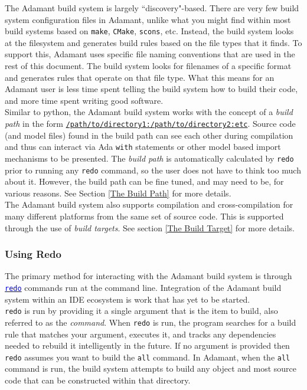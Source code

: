 The Adamant build system is largely ``discovery"-based. There are very few build system configuration files in Adamant, unlike what you might find within most build systems based on \texttt{make}, \texttt{CMake}, \texttt{scons}, etc. Instead, the build system looks at the filesystem and generates build rules based on the file types that it finds. To support this, Adamant uses specific file naming conventions that are used in the rest of this document. The build system looks for filenames of a specific format and generates rules that operate on that file type. What this means for an Adamant user is less time spent telling the build system how to build their code, and more time spent writing good software. \\

Similar to python, the Adamant build system works with the concept of a \textit{build path} in the form \texttt{\url{/path/to/directory1:/path/to/directory2:etc}}. Source code (and model files) found in the build path can see each other during compilation and thus can interact via Ada \texttt{with} statements or other model based import mechanisms to be presented. The \textit{build path} is automatically calculated by \texttt{redo} prior to running any \texttt{redo} command, so the user does not have to think too much about it. However, the build path can be fine tuned, and may need to be, for various reasons. See Section \ref{The Build Path} for more details. \\

The Adamant build system also supports compilation and cross-compilation for many different platforms from the same set of source code. This is supported through the use of \textit{build targets}. See section \ref{The Build Target} for more details.

\subsubsection{Using Redo} \label{Using Redo}

The primary method for interacting with the Adamant build system is through \href{https://redo.readthedocs.io/en/latest/}{\texttt{\textcolor{blue}{redo}}} commands run at the command line. Integration of the Adamant build system within an IDE ecosystem is work that has yet to be started. \\

\texttt{redo} is run by providing it a single argument that is the item to build, also referred to as the \textit{command}. When \texttt{redo} is run, the program searches for a build rule that matches your argument, executes it, and tracks any dependencies needed to rebuild it intelligently in the future.  If no argument is provided then \texttt{redo} assumes you want to build the \texttt{all} command. In Adamant, when the \texttt{all} command is run, the build system attempts to build any object and most source code that can be constructed within that directory. \\


